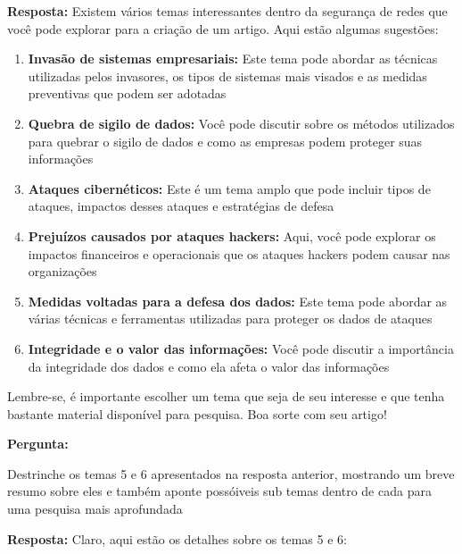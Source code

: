 \documentclass{article}
\begin{document}
\textbf{Resposta:}\newline
Existem vários temas interessantes dentro da segurança de redes que você pode explorar para a criação de um artigo. Aqui estão algumas sugestões:\newline
\begin{enumerate}
    \item \textbf{Invasão de sistemas empresariais:} Este tema pode abordar as técnicas utilizadas pelos invasores, os tipos de sistemas mais visados e as medidas preventivas que podem ser adotadas
    \item \textbf{Quebra de sigilo de dados:} Você pode discutir sobre os métodos utilizados para quebrar o sigilo de dados e como as empresas podem proteger suas informações
    \item \textbf{Ataques cibernéticos:} Este é um tema amplo que pode incluir tipos de ataques, impactos desses ataques e estratégias de defesa
    \item \textbf{Prejuízos causados por ataques hackers:} Aqui, você pode explorar os impactos financeiros e operacionais que os ataques hackers podem causar nas organizações
    \item \textbf{Medidas voltadas para a defesa dos dados:} Este tema pode abordar as várias técnicas e ferramentas utilizadas para proteger os dados de ataques
    \item \textbf{Integridade e o valor das informações:} Você pode discutir a importância da integridade dos dados e como ela afeta o valor das informações
\end{enumerate}
Lembre-se, é importante escolher um tema que seja de seu interesse e que tenha bastante material disponível para pesquisa. Boa sorte com seu artigo!\newline

\textbf{Pergunta:}\newline

Destrinche os temas 5 e 6 apresentados na resposta anterior, mostrando um breve resumo sobre eles e também aponte possóiveis sub temas dentro de cada para uma pesquisa mais aprofundada\newline

\textbf{Resposta:}\newline
Claro, aqui estão os detalhes sobre os temas 5 e 6:\newline
\end{document}
